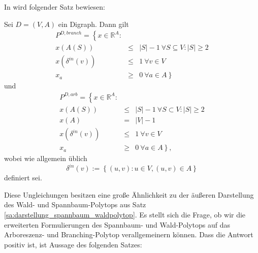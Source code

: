 \documentclass[10p,a4paper,BCOR = 12mm, DIV=15]{scrbook}
\begin{document}
In \cite{schrijver2003combinatorial} wird folgender Satz bewiesen:
\begin{Sa}
Sei $D=\left(V, A\right)$ ein Digraph. Dann gilt
\begin{eqnarray*}
P^{D, branch} = \left\{x \in \mathbb{R}^A: \right. & & \\
x\left(A\left(S\right)\right) & \leq & \left|S\right| - 1 \ \forall S \subseteq V: \left|S\right| \geq 2 \\
x\left(\delta^{in}\left(v\right)\right) & \leq & 1 \ \forall v \in V \\
x_a & \geq & \left. 0 \ \forall a \in A\right\}
\end{eqnarray*}
und
\begin{eqnarray*}
P^{D, arb} = \left\{x \in \mathbb{R}^A: \right. & & \\
x\left(A\left(S\right)\right) & \leq & \left|S\right| - 1 \ \forall S \subset V: \left|S\right| \geq 2 \\
x\left(A\right) & = & \left|V\right| - 1 \\
x\left(\delta^{in}\left(v\right)\right) & \leq & 1 \ \forall v \in V \\
x_a & \geq & \left. 0 \ \forall a \in A\right\},
\end{eqnarray*}
wobei wie allgemein üblich
\begin{displaymath}
\delta^{in}\left(v\right) := \left\{\left(u, v\right): u \in V, \left(u, v\right) \in A\right\}
\end{displaymath}
definiert sei.
\end{Sa}

Diese Ungleichungen besitzen eine große Ähnlichkeit zu der äußeren Darstellung des Wald- und Spannbaum-Polytops aus Satz \ref{sa:darstellung_spannbaum_waldpolytop}. Es stellt sich die Frage, ob wir die erweiterten Formulierungen des Spannbaum- und Wald-Polytops auf das Arboreszenz- und Branching-Polytop verallgemeinern können. Dass die Antwort positiv ist, ist Aussage des folgenden Satzes:
\end{document}

